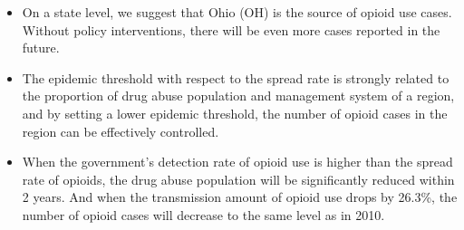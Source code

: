\documentclass[13pt]{ctexart}
\begin{document}
\begin{itemize}
	\item On a state level, we suggest that Ohio (OH) is the source of opioid use cases. Without policy interventions, there will be even more cases reported in the future.
	\item The epidemic threshold with respect to the spread rate is strongly related to the proportion of drug abuse population and management system of a region, and by setting a lower epidemic threshold, the number of opioid cases in the region can be effectively controlled.
	\item When the government's detection rate of opioid use is higher than the spread rate of opioids, the drug abuse population will be significantly reduced within 2 years. And when the transmission amount of opioid use drops by 26.3\%, the number of opioid cases will decrease to the same level as in 2010.
\end{itemize}
\end{document}
